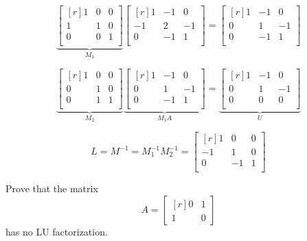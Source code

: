 \documentclass{jhwhw}
\begin{document}
\[
\underbrace{\begin{bmatrix*}[r]
  1    &    0    &     0 \\
  1    &    1    &     0 \\
  0    &    0    &     1 \\
\end{bmatrix*}}_{M_1}
\begin{bmatrix*}[r]
  1    &   -1    &     0 \\
  -1   &    2    &    -1 \\
  0    &   -1    &     1 \\
\end{bmatrix*}
=
\begin{bmatrix*}[r]
  1    &   -1    &     0 \\
  0    &    1    &    -1 \\
  0    &   -1    &     1 \\
\end{bmatrix*}
\]

\[
\underbrace{\begin{bmatrix*}[r]
  1    &    0    &     0 \\
  0    &    1    &     0 \\
  0    &    1    &     1 \\
\end{bmatrix*}}_{M_2}
\underbrace{\begin{bmatrix*}[r]
  1    &   -1    &     0 \\
  0    &    1    &    -1 \\
  0    &   -1    &     1 \\
\end{bmatrix*}}_{M_1A}
=
\underbrace{\begin{bmatrix*}[r]
  1    &   -1    &     0 \\
  0    &    1    &    -1 \\
  0    &    0    &     0 \\
\end{bmatrix*}}_{U}
\]

\[
L = M^{-1} = M_1^{-1} M_2^{-1} =
\begin{bmatrix*}[r]
   1    &    0    &     0 \\
  -1    &    1    &     0 \\
   0    &   -1    &     1 \\
\end{bmatrix*}
\]

Prove that the matrix \[
A = \begin{bmatrix*}[r]
	0  &  1 \\
	1  &  0
  \end{bmatrix*}
\] 
has no LU factorization.
\end{document}

